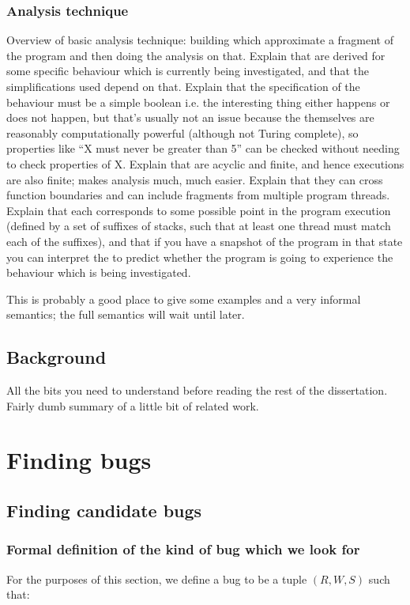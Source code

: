 \documentclass[12pt,a4paper]{book}
\begin{document}
\subsection{Analysis technique}
Overview of basic analysis technique: building \StateMachines which approximate a fragment of the program and then doing the analysis on that.
Explain that \StateMachines are derived for some specific behaviour which is currently being investigated, and that the simplifications used depend on that.
Explain that the specification of the behaviour must be a simple boolean i.e. the interesting thing either happens or does not happen, but that's usually not an issue because the \StateMachines themselves are reasonably computationally powerful (although not Turing complete), so properties like ``X must never be greater than 5'' can be checked without needing to check properties of X.
Explain that \StateMachines are acyclic and finite, and hence executions are also finite; makes analysis much, much easier.
Explain that they can cross function boundaries and can include fragments from multiple program threads.
Explain that each \StateMachine corresponds to some possible point in the program execution (defined by a set of suffixes of stacks, such that at least one thread must match each of the suffixes), and that if you have a snapshot of the program in that state you can interpret the \StateMachine to predict whether the program is going to experience the behaviour which is being investigated.

This is probably a good place to give some examples and a very informal semantics; the full semantics will wait until later.

\section{Background}
All the bits you need to understand before reading the rest of the dissertation.
Fairly dumb summary of a little bit of related work.

\chapter{Finding bugs}
\section{Finding candidate bugs}
\subsection{Formal definition of the kind of bug which we look for}
\label{sect:finding_bugs:finding_candidate_bugs:formal_definition}
For the purposes of this section, we define a bug to be a tuple $(R, W, S)$ such that:
\end{document}
